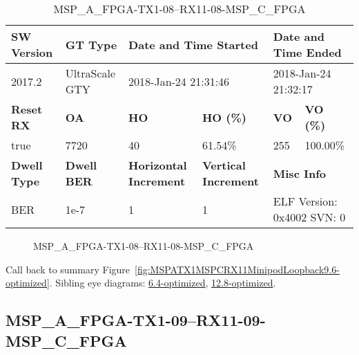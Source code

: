 \begin{table}[h]
\centering
\caption{MSP\_A\_FPGA-TX1-08--RX11-08-MSP\_C\_FPGA}
\label{tab:MSPAFPGATX108RX1108MSPCFPGA9.6-optimized}
\begin{tabular}{@{}|l|l|l|l|l|l|@{}}
\toprule
\textbf{SW Version}                & \textbf{GT Type}   & \multicolumn{2}{l|}{\textbf{Date and Time Started}}            & \multicolumn{2}{l|}{\textbf{Date and Time Ended}}        \\ \midrule
2017.2                       & UltraScale GTY          & \multicolumn{2}{l|}{2018-Jan-24 21:31:46}                   & \multicolumn{2}{l|}{2018-Jan-24 21:32:17}               \\ \midrule
\textbf{Reset RX}                  & \textbf{OA} & \textbf{HO}   & \textbf{HO (\%)} & \textbf{VO} & \textbf{VO (\%)} \\ \midrule
true & 7720        & 40          & 61.54\%        & 255        & 100.00\%       \\ \midrule
\textbf{Dwell Type}                & \textbf{Dwell BER} & \textbf{Horizontal Increment} & \textbf{Vertical Increment}    & \multicolumn{2}{l|}{\textbf{Misc Info}}                  \\ \midrule
BER                            & 1e-7        & 1        & 1           & \multicolumn{2}{l|}{ELF Version: 0x4002 SVN: 0}                         \\ \bottomrule
\end{tabular}
\end{table}

\begin{figure}[h]
\caption{MSP\_A\_FPGA-TX1-08--RX11-08-MSP\_C\_FPGA} \label{fig:MSPAFPGATX108RX1108MSPCFPGA9.6-optimized}
\end{figure}

Call back to summary Figure~\ref{fig:MSPATX1MSPCRX11MinipodLoopback9.6-optimized}.
Sibling eye diagrams: \hyperref[sec:MSPAFPGATX108RX1108MSPCFPGA6.4-optimized]{6.4-optimized}, \hyperref[sec:MSPAFPGATX108RX1108MSPCFPGA12.8-optimized]{12.8-optimized}.

\clearpage
\newpage


\subsection{MSP\_A\_FPGA-TX1-09--RX11-09-MSP\_C\_FPGA}\label{sec:MSPAFPGATX109RX1109MSPCFPGA9.6-optimized}

